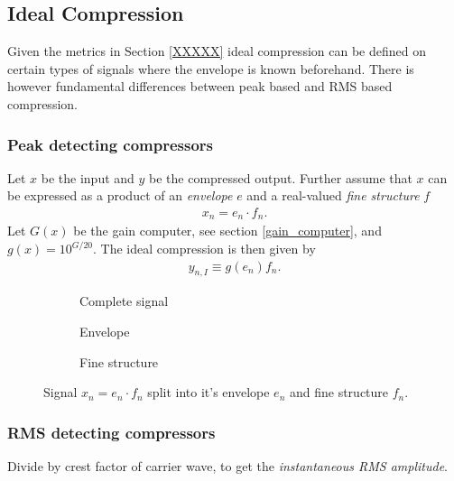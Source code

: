 \documentclass[../main2.tex]{subfiles}
\providecommand{\rootdir}{..}
\begin{document}
\subsection{Ideal Compression} \label{ideal_compression}
Given the metrics in Section \ref{XXXXX} ideal compression can be defined on certain types of signals where the envelope is known beforehand. There is however fundamental differences between peak based and RMS based compression.

\subsubsection{Peak detecting compressors}
Let $x$ be the input and $y$ be the compressed output. Further assume that $x$ can be expressed as a product of an \emph{envelope} $e$ and a real-valued \emph{fine structure} $f$ 
\begin{align}
x_n = e_n\cdot f_n.
\end{align}
Let $G(x)$ be the gain computer, see section \ref{gain_computer}, and $g(x) = 10^{G/20}$. The ideal compression is then given by
\begin{align}
y_{n,I} \equiv g(e_n) f_n. 
\end{align}


\begin{figure}
\captionsetup{justification=centering}
\begin{subfigure}{\linewidth}
\centering
\centerline{}
\caption{Complete signal}
\label{fig:signal_env_fine_struct}
\end{subfigure}
\par\bigskip
\begin{subfigure}{.5\linewidth}
\centering

\caption{Envelope}
\label{fig:signal_env}
\end{subfigure}
\begin{subfigure}{.5\linewidth}
\centering

\caption{Fine structure}
\label{fig:signal_fine_struct}
\end{subfigure}%
\caption{Signal $x_n = e_n\cdot f_n$ split into it's envelope $e_n$ and fine structure $f_n$.}
\label{fig:analytic_signal}
\end{figure}

\subsubsection{RMS detecting compressors}
Divide by crest factor of carrier wave, to get the \emph{instantaneous RMS amplitude}.
\end{document}
